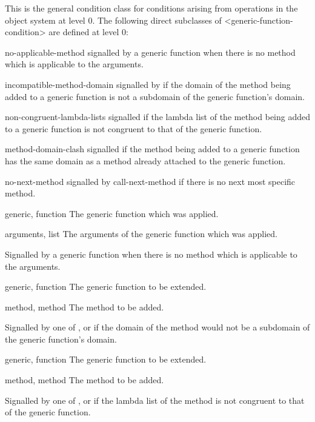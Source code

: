 \begin{optDefinition}
%
This is the general condition class for conditions arising from operations in
the object system at level 0. The following direct subclasses of
<generic-function-condition> are defined at level 0:
%
\begin{subclasses}
    \item[no-applicable-method] signalled by a generic function when there is
    no method which is applicable to the arguments.
    \item[incompatible-method-domain] signalled by if the domain of the method
    being added to a generic function is not a subdomain of the generic
    function's domain.
    \item[non-congruent-lambda-lists] signalled if the lambda list of the
    method being added to a generic function is not congruent to that of the
    generic function.
    \item[method-domain-clash] signalled if the method being added to a
    generic function has the same domain as a method already attached to the
    generic function.
    \item[no-next-method] signalled by call-next-method if there is no next
    most specific method.
\end{subclasses}
%
%
\begin{initoptions}
    \item[generic, function] The generic function which was applied.
    \item[arguments, list] The arguments of the generic function which was
    applied.
\end{initoptions}
%
\remarks%
Signalled by a generic function when there is no method which is applicable to
the arguments.

%
\begin{initoptions}
    \item[generic, function] The generic function to be extended.
    \item[method, method] The method to be added.
\end{initoptions}
%
\remarks%
Signalled by one of ,  or
 if the domain of the method would not be a subdomain
of the generic function's domain.

%
\begin{initoptions}
    \item[generic, function] The generic function to be extended.
    \item[method, method] The method to be added.
\end{initoptions}
%
\remarks%
Signalled by one of ,  or
 if the lambda list of the method is not congruent to
that of the generic function.


\end{optDefinition}
